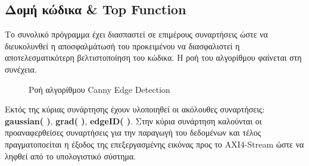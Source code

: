 \subsection{Δομή κώδικα \& Top Function}

Το συνολικό πρόγραμμα έχει διασπαστεί σε επιμέρους συναρτήσεις ώστε να διευκολυνθεί η αποσφαλμάτωσή του προκειμένου να διασφαλιστεί η αποτελεσματικότερη βελτιστοποίηση του κώδικα. Η ροή του αλγορίθμου φαίνεται στη συνέχεια.
\begin{figure}[H]
\begin{center}
\end{center}
\caption{Ροή αλγορίθμου Canny Edge Detection}
\end{figure}

Εκτός της κύριας συνάρτησης έχουν υλοποιηθεί οι ακόλουθες συναρτήσεις: \textbf{gaussian( )}, \textbf{grad( )}, \textbf{edgeID( )}.
Στην κύρια συνάρτηση καλούνται οι προαναφερθείσες συναρτήσεις για την παραγωγή του δεδομένων και τέλος πραγματοποείται η έξοδος της επεξεργασμένης εικόνας προς το AXI4-Stream ώστε να ληφθεί από το υπολογιστικό σύστημα.

